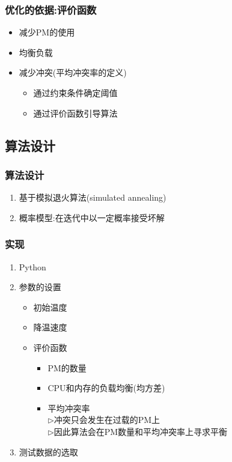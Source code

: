 \documentclass[slidestop,compress,mathserif,blue,12pt,adobefonts]{beamer}
\begin{document}
\begin{frame}
  \frametitle{优化的依据:评价函数}
  \begin{itemize}
  \item <1->减少PM的使用
  \item <2->均衡负载
  \item <3->减少冲突(平均冲突率的定义)
    \begin{itemize}
    \item 通过约束条件确定阈值
    \item 通过评价函数引导算法
    \end{itemize}
  \end{itemize}
\end{frame}

\subsection{算法设计}

\begin{frame}
  \frametitle{算法设计}
    \begin{enumerate}
    \item <1-> 基于模拟退火算法(simulated annealing)
    \item <1-|alert@1> 概率模型:在迭代中以一定概率接受坏解
    \end{enumerate}
\end{frame}

\begin{frame}
  \frametitle{实现}
  \begin{enumerate}
  \item Python
  \item 参数的设置
    \begin{itemize}
    \item 初始温度
    \item 降温速度
    \item 评价函数
      \begin{itemize}
      \item PM的数量
      \item CPU和内存的负载均衡(均方差)
      \item 平均冲突率\\
         $\rhd$冲突只会发生在过载的PM上\\
         $\rhd$因此算法会在PM数量和平均冲突率上寻求平衡
      \end{itemize}
    \end{itemize}
  \item 测试数据的选取
  \end{enumerate}
\end{frame}
\end{document}
